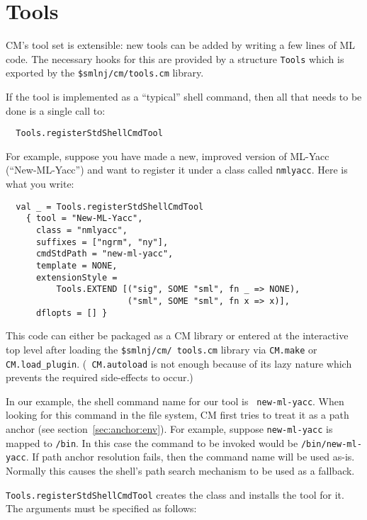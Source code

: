 \documentclass[titlepage,letterpaper]{article}
\begin{document}
\section{Tools}
\label{sec:tools}

CM's tool set is extensible: new tools can be added by writing a few
lines of ML code.  The necessary hooks for this are provided by a
structure {\tt Tools} which is exported by the {\tt \$smlnj/cm/tools.cm}
library.

If the tool is implemented as a ``typical'' shell command, then all
that needs to be done is a single call to:

\begin{verbatim}
  Tools.registerStdShellCmdTool
\end{verbatim}

For example, suppose you have made a
new, improved version of ML-Yacc (``New-ML-Yacc'') and want to
register it under a class called {\tt nmlyacc}.  Here is what you
write:

\begin{verbatim}
  val _ = Tools.registerStdShellCmdTool
    { tool = "New-ML-Yacc",
      class = "nmlyacc",
      suffixes = ["ngrm", "ny"],
      cmdStdPath = "new-ml-yacc",
      template = NONE,
      extensionStyle =
          Tools.EXTEND [("sig", SOME "sml", fn _ => NONE),
                        ("sml", SOME "sml", fn x => x)],
      dflopts = [] }
\end{verbatim}

\begin{sloppy}
This code can either be packaged as a CM library or entered at the
interactive top level after loading the {\tt \$smlnj/cm/ tools.cm}
library via {\tt CM.make} or {\tt CM.load\_plugin}.  ({\tt
CM.autoload} is not enough because of its lazy nature which prevents
the required side-effects to occur.)
\end{sloppy}

In our example, the shell command name for our tool is {\tt
new-ml-yacc}.  When looking for this command in the file system, CM
first tries to treat it as a path anchor (see
section~\ref{sec:anchor:env}).  For example, suppose {\tt new-ml-yacc} is
mapped to {\tt /bin}.  In this case the command to be
invoked would be {\tt /bin/new-ml-yacc}.  If path anchor resolution
fails, then the command name will be used as-is.  Normally this
causes the shell's path search mechanism to be used as a fallback.

{\tt Tools.registerStdShellCmdTool} creates the class and installs the
tool for it.  The arguments must be specified as follows:
\end{document}
